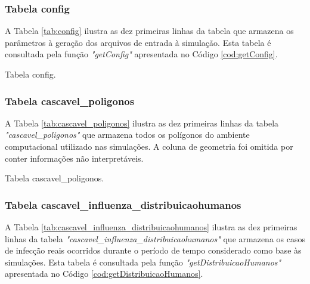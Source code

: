 \subsubsection{Tabela config}

A Tabela \ref{tab:config} ilustra as dez primeiras linhas da tabela que armazena os parâmetros à geração dos arquivos de entrada à simulação. Esta tabela é consultada pela função \textit{"getConfig"} apresentada no Código \ref{cod:getConfig}. 

\begin{table}[H]
\centering
{}
\caption{Tabela config.}
\label{tab:config}
\end{table}

\subsubsection{Tabela cascavel\_poligonos}

A Tabela \ref{tab:cascavel_poligonos} ilustra as dez primeiras linhas da tabela \textit{"cascavel\_poligonos"} que armazena todos os polígonos do ambiente computacional utilizado nas simulações. A coluna de geometria foi omitida por conter informações não interpretáveis. 

\begin{table}[H]
\centering
{}
\caption{Tabela cascavel\_poligonos.}
\label{tab:cascavel_poligonos}
\end{table}

\subsubsection{Tabela cascavel\_influenza\_distribuicaohumanos}

A Tabela \ref{tab:cascavel_influenza_distribuicaohumanos} ilustra as dez primeiras linhas da tabela \textit{"cascavel\_influenza\_distribuicaohumanos"} que armazena os casos de infecção reais ocorridos durante o período de tempo considerado como base às simulações. Esta tabela é consultada pela função \textit{"getDistribuicaoHumanos"} apresentada no Código \ref{cod:getDistribuicaoHumanos}. 

